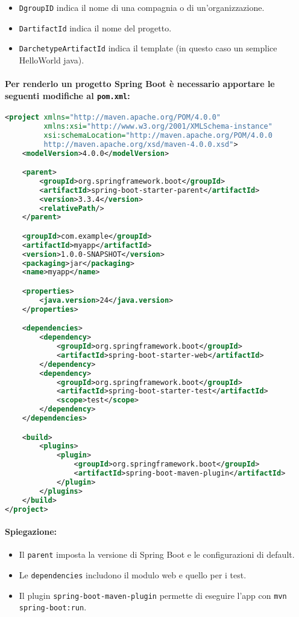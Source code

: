 \begin{itemize}
	\item \texttt{DgroupID} indica il nome di una compagnia o di un'organizzazione.
	\item \texttt{DartifactId} indica il nome del progetto.
	\item \texttt{DarchetypeArtifactId} indica il template (in questo caso un semplice HelloWorld java).
\end{itemize}

\paragraph{Per renderlo un progetto Spring Boot è necessario apportare le seguenti modifiche al \texttt{pom.xml}:}

\begin{lstlisting}[language=xml, caption={Esempio di pom.xml per Spring Boot}]
<project xmlns="http://maven.apache.org/POM/4.0.0"
         xmlns:xsi="http://www.w3.org/2001/XMLSchema-instance"
         xsi:schemaLocation="http://maven.apache.org/POM/4.0.0
         http://maven.apache.org/xsd/maven-4.0.0.xsd">
    <modelVersion>4.0.0</modelVersion>

    <parent>
        <groupId>org.springframework.boot</groupId>
        <artifactId>spring-boot-starter-parent</artifactId>
        <version>3.3.4</version>
        <relativePath/>
    </parent>

    <groupId>com.example</groupId>
    <artifactId>myapp</artifactId>
    <version>1.0.0-SNAPSHOT</version>
    <packaging>jar</packaging>
    <name>myapp</name>

    <properties>
        <java.version>24</java.version>
    </properties>

    <dependencies>
        <dependency>
            <groupId>org.springframework.boot</groupId>
            <artifactId>spring-boot-starter-web</artifactId>
        </dependency>
        <dependency>
            <groupId>org.springframework.boot</groupId>
            <artifactId>spring-boot-starter-test</artifactId>
            <scope>test</scope>
        </dependency>
    </dependencies>

    <build>
        <plugins>
            <plugin>
                <groupId>org.springframework.boot</groupId>
                <artifactId>spring-boot-maven-plugin</artifactId>
            </plugin>
        </plugins>
    </build>
</project>
\end{lstlisting}
\paragraph{Spiegazione:}
\begin{itemize}
	\item Il \texttt{parent} imposta la versione di Spring Boot e le configurazioni di default.
	\item Le \texttt{dependencies} includono il modulo web e quello per i test.
	\item Il plugin \texttt{spring-boot-maven-plugin} permette di eseguire l'app con \texttt{mvn spring-boot:run}.
\end{itemize}
